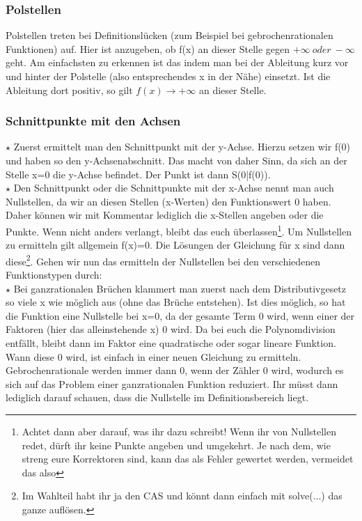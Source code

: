 	\subsubsection{Polstellen}
		Polstellen treten bei Definitionslücken (zum Beispiel bei gebrochenrationalen
		Funktionen) auf. Hier ist anzugeben, ob f(x) an dieser Stelle gegen \(+\infty\
		oder\ -\infty\) geht. Am einfachsten zu erkennen ist das indem man bei der
		Ableitung kurz vor und hinter der Polstelle (also entsprechendes x in der
		Nähe) einsetzt. Ist die Ableitung dort positiv, so gilt \(f(x)\rightarrow +
		\infty\) an dieser Stelle.

	\subsubsection{Schnittpunkte mit den Achsen}
		\(\star\) Zuerst ermittelt man den Schnittpunkt mit der y-Achse. Hierzu setzen
		wir f(0) und haben so den y-Achsenabschnitt. Das macht von daher Sinn, da sich
		an der Stelle x=0 die y-Achse befindet. Der Punkt ist dann S(0|f(0)).\\

		\(\star\) Den Schnittpunkt oder die Schnittpunkte mit der x-Achse nennt man
		auch Nullstellen, da wir an diesen Stellen (x-Werten) den Funktionswert 0
		haben. Daher können wir mit Kommentar lediglich die x-Stellen angeben oder die
		Punkte. Wenn nicht anders verlangt, bleibt das euch überlassen\footnote{Achtet
		dann aber darauf, was ihr dazu schreibt! Wenn ihr von Nullstellen redet, dürft
		ihr keine Punkte angeben und umgekehrt. Je nach dem, wie streng eure
		Korrektoren sind, kann das als Fehler gewertet werden, vermeidet das also}. Um
		Nullstellen zu ermitteln gilt allgemein f(x)=0. Die Lösungen der Gleichung für
		x sind dann diese\footnote{Im Wahlteil habt ihr ja den CAS und könnt dann
		einfach mit solve(...) das ganze auflösen.}. Gehen wir nun das ermitteln der
		Nullstellen bei den verschiedenen Funktionstypen durch:\\

		\(\star\) Bei ganzrationalen Brüchen klammert man zuerst nach dem
		Distributivgesetz so viele x wie möglich aus (ohne das Brüche entstehen). Ist
		dies möglich, so hat die Funktion eine Nullstelle bei x=0, da der gesamte Term
		0 wird, wenn einer der Faktoren (hier das alleinstehende x) 0 wird. Da bei
		euch die Polynomdivision entfällt, bleibt dann im Faktor eine quadratische
		oder sogar lineare Funktion. Wann diese 0 wird, ist einfach in einer neuen
		Gleichung zu ermitteln. Gebrochenrationale werden immer dann 0, wenn der
		Zähler 0 wird, wodurch es sich auf das Problem einer ganzrationalen Funktion
		reduziert. Ihr müsst dann lediglich darauf schauen, dass die Nullstelle im
		Definitionsbereich liegt.\\

